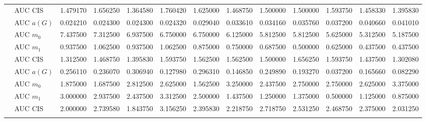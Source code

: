 \begin{table}[htbp]
\begin{tabular}{llrrrrrrrrrrr}
    & AUC CIS & 1.479170 & 1.656250 & 1.364580 & 1.760420 & 1.625000 & 1.468750 & 1.500000 & 1.500000 & 1.593750 & 1.458330 & 1.395830 \\
    \addlinespace
    \multirow{4}{*}{degree} & AUC $a(G)$ & 0.024210 & 0.024300 & 0.024300 & 0.024320 & 0.029040 & 0.033610 & 0.034160 & 0.035760 & 0.037200 & 0.040660 & 0.041010 \\
    & AUC $m_0$ & 7.437500 & 7.312500 & 6.937500 & 6.750000 & 6.750000 & 6.125000 & 5.812500 & 5.812500 & 5.625000 & 5.312500 & 5.187500 \\
    & AUC $m_1$ & 0.937500 & 1.062500 & 0.937500 & 1.062500 & 0.875000 & 0.750000 & 0.687500 & 0.500000 & 0.625000 & 0.437500 & 0.437500 \\
    & AUC CIS & 1.312500 & 1.468750 & 1.395830 & 1.593750 & 1.562500 & 1.562500 & 1.500000 & 1.656250 & 1.593750 & 1.437500 & 1.302080 \\
    \addlinespace
    \multirow{4}{*}{random} & AUC $a(G)$ & 0.256110 & 0.236070 & 0.306940 & 0.127980 & 0.296310 & 0.146850 & 0.249890 & 0.193270 & 0.037200 & 0.165660 & 0.082290 \\
    & AUC $m_0$ & 1.875000 & 1.687500 & 2.812500 & 2.625000 & 1.562500 & 3.250000 & 2.437500 & 2.750000 & 2.750000 & 2.625000 & 3.375000 \\
    & AUC $m_1$ & 3.000000 & 2.937500 & 2.437500 & 3.312500 & 2.500000 & 1.437500 & 1.250000 & 1.375000 & 0.500000 & 1.125000 & 0.875000 \\
    & AUC CIS & 2.000000 & 2.739580 & 1.843750 & 3.156250 & 2.395830 & 2.218750 & 2.718750 & 2.531250 & 2.468750 & 2.375000 & 2.031250 \\
    \addlinespace
    \bottomrule
  \end{tabular}
\end{table}

